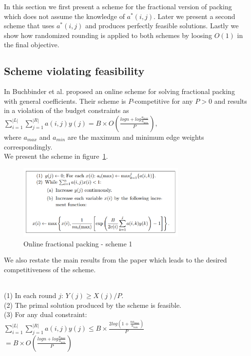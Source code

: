 In this section we first present a scheme for the fractional version of packing which does not assume the knowledge of $a^\ast(i,j)$. Later we present a second scheme that uses $a^\ast(i,j)$ and produces perfectly feasible solutions. Lastly we show how randomized  rounding is applied to both schemes by loosing $O(1)$ in the final objective.
\subsection{Scheme violating feasibility}
In \cite{buchbinder2009online} Buchbinder et al. proposed an online scheme for solving fractional packing with general coefficients.  Their scheme is $P$-competitive for any $P >0$ and results in a violation of the budget constraints as\\
$\sum_{i=1}^{|L|} \sum_{j=1}^{|R|} a(i,j)y(j) = B \times O(\frac{log n + log \frac{a_{max}}{a_{min}}}{P}) $,\\
where $a_{max}$ and $a_{min}$ are the maximum and minimum edge weights correspondingly.\\

We present the scheme in figure~\ref{fig:algo1}.\\
\begin{figure}[h]
  \centering
  \includegraphics[width=3.3in]{figs/algo1.png}
  \caption{Online fractional packing - scheme 1}
  \label{fig:algo1}
\end{figure}
We also restate the main results from the paper which leads to the desired competitiveness of the scheme.
\begin{lemma}
\begin{itemize}
\ \\
(1) In each round $j$: $Y (j) \geq X(j)/P$.\\
(2) The primal solution produced by the scheme is feasible.\\
(3) For any dual constraint:\\
$\sum_{i=1}^{|L|} \sum_{j=1}^{|R|} a(i,j)y(j) \leq B \times \frac{2 log (1 + \frac{n a_{max}}{a_{min}})}{P}$ \ \\
$ = B \times O(\frac{log n + log \frac{a_{max}}{a_{min}}}{P})$
\end{itemize}
\end{lemma}
